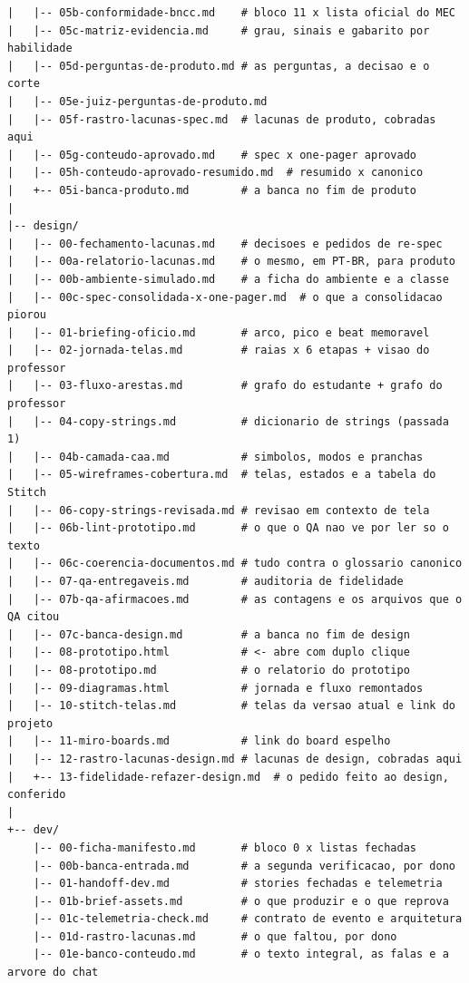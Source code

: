 \documentclass[11pt,a4paper]{article}
\begin{document}
\begin{lstlisting}
|   |-- 05b-conformidade-bncc.md    # bloco 11 x lista oficial do MEC
|   |-- 05c-matriz-evidencia.md     # grau, sinais e gabarito por habilidade
|   |-- 05d-perguntas-de-produto.md # as perguntas, a decisao e o corte
|   |-- 05e-juiz-perguntas-de-produto.md
|   |-- 05f-rastro-lacunas-spec.md  # lacunas de produto, cobradas aqui
|   |-- 05g-conteudo-aprovado.md    # spec x one-pager aprovado
|   |-- 05h-conteudo-aprovado-resumido.md  # resumido x canonico
|   +-- 05i-banca-produto.md        # a banca no fim de produto
|
|-- design/
|   |-- 00-fechamento-lacunas.md    # decisoes e pedidos de re-spec
|   |-- 00a-relatorio-lacunas.md    # o mesmo, em PT-BR, para produto
|   |-- 00b-ambiente-simulado.md    # a ficha do ambiente e a classe
|   |-- 00c-spec-consolidada-x-one-pager.md  # o que a consolidacao piorou
|   |-- 01-briefing-oficio.md       # arco, pico e beat memoravel
|   |-- 02-jornada-telas.md         # raias x 6 etapas + visao do professor
|   |-- 03-fluxo-arestas.md         # grafo do estudante + grafo do professor
|   |-- 04-copy-strings.md          # dicionario de strings (passada 1)
|   |-- 04b-camada-caa.md           # simbolos, modos e pranchas
|   |-- 05-wireframes-cobertura.md  # telas, estados e a tabela do Stitch
|   |-- 06-copy-strings-revisada.md # revisao em contexto de tela
|   |-- 06b-lint-prototipo.md       # o que o QA nao ve por ler so o texto
|   |-- 06c-coerencia-documentos.md # tudo contra o glossario canonico
|   |-- 07-qa-entregaveis.md        # auditoria de fidelidade
|   |-- 07b-qa-afirmacoes.md        # as contagens e os arquivos que o QA citou
|   |-- 07c-banca-design.md         # a banca no fim de design
|   |-- 08-prototipo.html           # <- abre com duplo clique
|   |-- 08-prototipo.md             # o relatorio do prototipo
|   |-- 09-diagramas.html           # jornada e fluxo remontados
|   |-- 10-stitch-telas.md          # telas da versao atual e link do projeto
|   |-- 11-miro-boards.md           # link do board espelho
|   |-- 12-rastro-lacunas-design.md # lacunas de design, cobradas aqui
|   +-- 13-fidelidade-refazer-design.md  # o pedido feito ao design, conferido
|
+-- dev/
    |-- 00-ficha-manifesto.md       # bloco 0 x listas fechadas
    |-- 00b-banca-entrada.md        # a segunda verificacao, por dono
    |-- 01-handoff-dev.md           # stories fechadas e telemetria
    |-- 01b-brief-assets.md         # o que produzir e o que reprova
    |-- 01c-telemetria-check.md     # contrato de evento e arquitetura
    |-- 01d-rastro-lacunas.md       # o que faltou, por dono
    |-- 01e-banco-conteudo.md       # o texto integral, as falas e a arvore do chat

\end{lstlisting}
\end{document}
